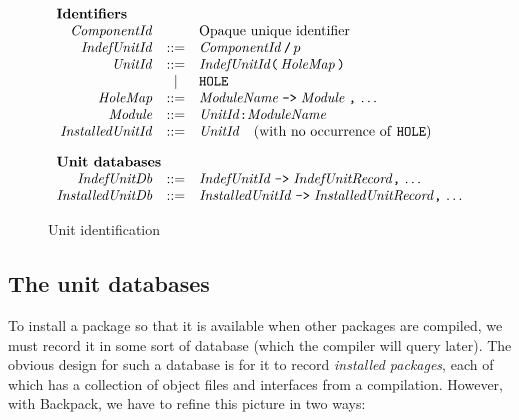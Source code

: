\documentclass{article}
\newcommand{\I}[1]{\ensuremath{\mathit{#1}}}
\begin{document}
\begin{figure}[htpb]
$$
\begin{array}{rcll}
\multicolumn{3}{l}{\mbox{\bf Identifiers}} \\
  \I{ComponentId} &  & \mbox{Opaque unique identifier} \\
  \I{IndefUnitId} & ::= & \I{ComponentId}\, \verb|/|\, p  \\
  \I{UnitId} & ::= & \I{IndefUnitId} \verb|(|\, \I{HoleMap}\, \verb|)|  \\
              & | & \verb|HOLE| \\
  \I{HoleMap} & ::= & \I{ModuleName}\; \verb|->|\; \I{Module}\; \verb|,|\, \ldots \\
  \I{Module} & ::= & \I{UnitId} \verb|:| \I{ModuleName}  \\
  \I{InstalledUnitId} & ::= & \I{UnitId} \quad \mbox{(with no occurrence of \texttt{HOLE})} \\[1em]
\multicolumn{3}{l}{\mbox{\bf Unit databases}} \\
  \I{IndefUnitDb} & ::= & \I{IndefUnitId} \; \verb|->| \; \I{IndefUnitRecord} \verb|,|\, \ldots \\
  \I{InstalledUnitDb} & ::= & \I{InstalledUnitId} \; \verb|->| \; \I{InstalledUnitRecord} \verb|,|\, \ldots \\
\end{array}
$$
\caption{Unit identification} \label{fig:ids}
\end{figure}

\subsection{The unit databases}

To install a package so that it is available when other packages are compiled,
we must record it in some sort of database (which the compiler will query later).
The obvious design for such a database is for it to record \emph{installed packages},
each of which has a collection of object files and interfaces from a compilation.
However, with Backpack, we have to refine this picture in two ways:
\end{document}
